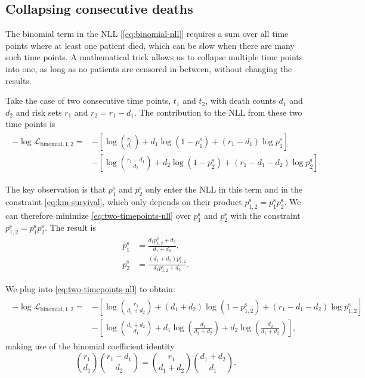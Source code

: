 \documentclass[article]{jss}
\begin{document}
\subsection{Collapsing consecutive deaths}\label{sec:collapsing-consecutive-deaths}

The binomial term in the NLL [\cref{eq:binomial-nll}] requires a sum over all time points where at least one patient died, which can be slow when there are many such time points. A mathematical trick allows us to collapse multiple time points into one, as long as no patients are censored in between, without changing the results.

Take the case of two consecutive time points, \(t_1\) and \(t_{2}\), with death counts \(d_1\) and \(d_{2}\) and risk sets \(r_1\) and \(r_{2}=r_1-d_1\)\@.  The contribution to the NLL from these two time points is
\begin{align}
\begin{aligned}
-\log \mathcal{L}_{\text{binomial},1,2} =&-\left[\log\binom{r_1}{d_1} + d_1 \log \left(1-p_1^\text{s}\right) + (r_1-d_1) \log p_1^\text{s}\right] \\
&-\left[\log\binom{r_{1}-d_{1}}{d_{2}} + d_{2} \log \left(1-p_{2}^\text{s}\right) + (r_{1}-d_{1}-d_{2}) \log p_{2}^\text{s}\right].
\end{aligned}
\label{eq:two-timepoints-nll}
\end{align}

The key observation is that \(p_1^\text{s}\) and \(p_2^\text{s}\) only enter the NLL in this term and in the constraint \cref{eq:km-survival}, which only depends on their product \(p_{1,2}^\text{s}=p_1^\text{s} p_2^\text{s}\)\@. We can therefore minimize \cref{eq:two-timepoints-nll} over \(p_1^\text{s}\) and \(p_2^\text{s}\) with the constraint \(p_{1,2}^\text{s}=p_1^\text{s} p_2^\text{s}\)\@.  The result is
\begin{align}
p_1^\text{s} &= \frac{d_1 p_{1,2}^\text{s}+d_2}{d_1+d_2}, \\
p_2^\text{s} &= \frac{(d_1+d_2) p_{1,2}^\text{s}}{d_1 p_{1,2}^\text{s} + d_2}.
\end{align}

We plug into \cref{eq:two-timepoints-nll} to obtain:
\begin{align}
\begin{aligned}
-\log \mathcal{L}_{\text{binomial},1,2} =&-\left[\log\binom{r_1}{d_1+d_2} + (d_1+d_2) \log \left(1-p_{1,2}^\text{s}\right) + (r_1-d_1-d_2) \log p_{1,2}^\text{s}\right] \\
&-\left[\log\binom{d_1+d_2}{d_1} + d_1 \log \left(\frac{d_1}{d_1+d_2}\right) + d_2 \log \left(\frac{d_2}{d_1+d_2}\right)\right],
\end{aligned}
\label{eq:two-timepoints-collapsed-nll}
\end{align}
making use of the binomial coefficient identity
\begin{equation}
\binom{r_1}{d_1}\binom{r_1-d_1}{d_2} = \binom{r_1}{d_1+d_2}\binom{d_1+d_2}{d_1}.
\end{equation}
\end{document}
